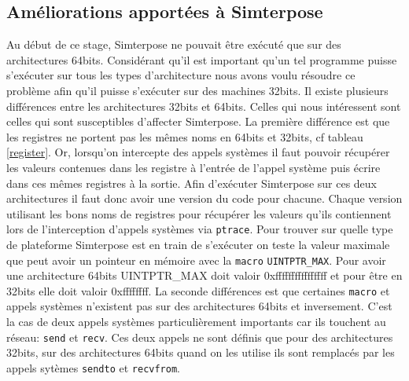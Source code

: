 \subsection{Améliorations apportées à Simterpose}

Au début de ce stage, Simterpose ne pouvait être exécuté que sur des architectures 64bits. Considérant qu'il est important qu'un tel programme puisse s'exécuter sur tous les types d'architecture nous avons voulu résoudre ce problème afin qu'il puisse s'exécuter sur des machines 32bits. Il existe plusieurs différences entre les architectures 32bits et 64bits. Celles qui nous intéressent sont celles qui sont susceptibles d'affecter Simterpose. La première différence est que les registres ne portent pas les mêmes noms en 64bits et 32bits, cf tableau \ref{register}. Or, lorsqu'on intercepte des appels systèmes il faut pouvoir récupérer les valeurs contenues dans les registre à l'entrée de l'appel système puis écrire dans ces mêmes registres à la sortie. Afin d'exécuter Simterpose sur ces deux architectures il faut donc avoir une version du code pour chacune. Chaque version utilisant les bons noms de registres pour récupérer les valeurs qu'ils contiennent lors de l'interception d'appels systèmes via \texttt{ptrace}. Pour trouver sur quelle type de plateforme Simterpose est en train de s'exécuter on teste la valeur maximale que peut avoir un pointeur en mémoire avec la \texttt{macro} \texttt{UINTPTR\_MAX}. Pour avoir une architecture 64bits UINTPTR\_MAX doit valoir 0xffffffffffffffff et pour être en 32bits elle doit valoir 0xffffffff. La seconde différences est que certaines \texttt{macro} et appels systèmes n'existent pas sur des architectures 64bits et inversement. C'est la cas de deux appels systèmes particulièrement importants car ils touchent au réseau: \texttt{send} et \texttt{recv}. Ces deux appels ne sont définis que pour des architectures 32bits, sur des architectures 64bits quand on les utilise ils sont remplacés par les appels sytèmes \texttt{sendto} et \texttt{recvfrom}.

